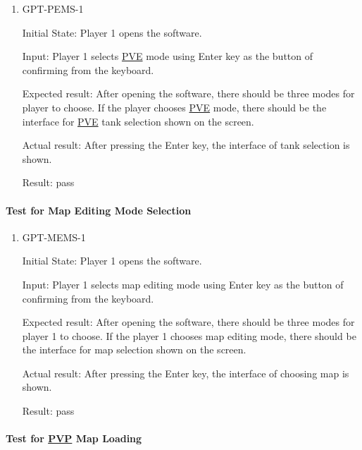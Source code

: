\documentclass[12pt, titlepage]{article}
\begin{document}
\begin{enumerate}

\item{GPT-PEMS-1\\}
					
Initial State: Player 1 opens the software.
					
Input: Player 1 selects \underline{PVE} mode using Enter key as the button of confirming from the keyboard.
					
Expected result: After opening the software, there should be three modes for player to choose. If the player chooses \underline{PVE} mode, there should be the interface for \underline{PVE} tank selection shown on the screen. 
					
Actual result: After pressing the Enter key, the interface of tank selection is shown.

Result: pass

\end{enumerate}

\paragraph{Test for Map Editing Mode Selection}

\begin{enumerate}

\item{GPT-MEMS-1\\}
					
Initial State: Player 1 opens the software.
					
Input: Player 1 selects map editing mode using Enter key as the button of confirming from the keyboard.
					
Expected result: After opening the software, there should be three modes for player 1 to choose. If the player 1 chooses map editing mode, there should be the interface for map selection shown on the screen.
					
Actual result: After pressing the Enter key, the interface of choosing map is shown.

Result: pass

\end{enumerate}

\paragraph{Test for \underline{PVP} Map Loading}
\end{document}
